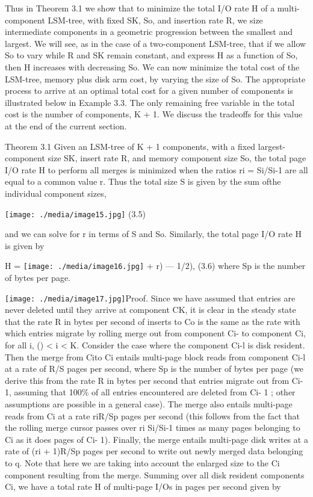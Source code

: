 \documentclass[a4paper,11pt,notitlepage,twoside,openright]{article}
\begin{document}
Thus in Theorem 3.1 we show that to minimize the total I/O rate H of a
multi-component LSM-tree, with fixed SK, So, and insertion rate R, we
size intermediate components in a geometric progression between the
smallest and largest. We will see, as in the case of a two-component
LSM-tree, that if we allow So to vary while R and SK remain constant,
and express H as a function of So, then H increases with decreasing So.
We can now minimize the total cost of the LSM-tree, memory plus disk arm
cost, by varying the size of So. The appropriate process to arrive at an
optimal total cost for a given number of components is illustrated below
in Example 3.3. The only remaining free variable in the total cost is
the number of components, K + 1. We discuss the tradeoffs for this value
at the end of the current section.

Theorem 3.1 Given an LSM-tree of K + 1 components, with a fixed
largest-component size SK, insert rate R, and memory component size So,
the total page I/O rate H to perform all merges is minimized when the
ratios ri = Si/Si-1 are all equal to a common value r. Thus the total
size S is given by the sum ofthe individual component sizes,


\texttt{[image: ./media/image15.jpg]}
(3.5)


and we can solve for r in terms of S and So. Similarly, the total page
I/O rate H is given by

H =
\texttt{[image: ./media/image16.jpg]}
+ r) --- 1/2), (3.6) where Sp is the number of bytes per page.

\texttt{[image: ./media/image17.jpg]}Proof. Since we have assumed that
entries are never deleted until they arrive at component CK, it is clear
in the steady state that the rate R in bytes per second of inserts to Co
is the same as the rate with which entries migrate by rolling merge out
from component Ci- to component Ci, for all i, () \textless{} i
\textless{} K. Consider the case where the component Ci-l is disk
resident. Then the merge from Cito Ci entails multi-page block reads
from component Ci-l at a rate of R/S pages per second, where Sp is the
number of bytes per page (we derive this from the rate R in bytes per
second that entries migrate out from Ci- 1, assuming that 100\% of all
entries encountered are deleted from Ci- 1 ; other assumptions are
possible in a general case). The merge also entails multi-page reads
from Ci at a rate riR/Sp pages per second (this follows from the fact
that the rolling merge cursor passes over ri Si/Si-1 times as many pages
belonging to Ci as it does pages of Ci- 1). Finally, the merge entails
multi-page disk writes at a rate of (ri + 1)R/Sp pages per second to
write out newly merged data belonging to q. Note that here we are taking
into account the enlarged size to the Ci component resulting from the
merge. Summing over all disk resident components Ci, we have a total
rate H of multi-page I/Os in pages per second given by
\end{document}
